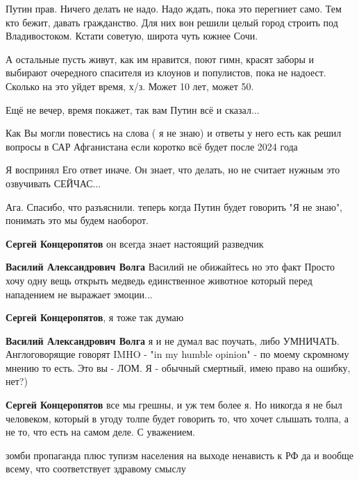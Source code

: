 \begin{itemize}
Путин прав. Ничего делать не надо. Надо ждать, пока это перегниет само. Тем кто
бежит, давать гражданство. Для них вон решили целый город строить под
Владивостоком. Кстати советую, широта чуть южнее Сочи.

А остальные пусть живут, как им нравится, поют гимн, красят заборы и выбирают
очередного спасителя из клоунов и популистов, пока не надоест. Сколько на это
уйдет время, х/з. Может 10 лет, может 50.

Ещё не вечер, время покажет, так вам Путин всё и сказал...


Как Вы могли повестись на слова ( я не знаю) и ответы у него есть как решил вопросы в
САР Афганистана если коротко всё будет после 2024 года

Я воспринял Его ответ иначе. Он знает, что делать, но не считает нужным это озвучивать СЕЙЧАС...

\begin{itemize} %
Ага. Спасибо, что разъяснили. теперь когда Путин будет говорить "Я не знаю", понимать это мы будем наоборот.

\textbf{Сергей Концеропятов} он всегда знает настоящий разведчик

\textbf{Василий Александрович Волга} Василий не обижайтесь но это факт
Просто хочу одну вещь открыть медведь единственное животное который перед нападением не выражает эмоции...

\textbf{Сергей Концеропятов}, я тоже так думаю

\textbf{Василий Александрович Волга} я и не думал вас поучать, либо УМНИЧАТЬ. Англоговорящие говорят IMHO - "in my humble opinion" - по моему скромному мнению то есть. Это вы - ЛОМ. Я - обычный смертный, имею право на ошибку, нет?)

\textbf{Сергей Концеропятов} все мы грешны, и уж тем более я. Но никогда я не был человеком, который в угоду толпе будет говорить то, что хочет слышать толпа, а не то, что есть на самом деле. С уважением.
\end{itemize} %


зомби пропаганда плюс тупизм населения на выходе ненависть к РФ да и вообще
всему, что соответствует здравому смыслу


\end{itemize}
